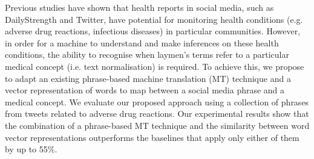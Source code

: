 Previous studies have shown that health reports in social media, such as DailyStrength and Twitter, have potential for monitoring health conditions (e.g. adverse drug reactions, infectious diseases) in particular communities. However, in order for a machine to understand and make inferences on these health conditions, the ability to recognise when laymen's terms refer to a particular medical concept (i.e. text normalisation) is required. To achieve this, we propose to adapt an existing phrase-based machine translation (MT) technique and a vector representation of words to map between a social media phrase and a medical concept. We evaluate our proposed approach using a collection of phrases from tweets related to adverse drug reactions. Our experimental results show that the combination of a phrase-based MT technique and the similarity between word vector representations outperforms the baselines that apply only either of them by up to 55\%.
